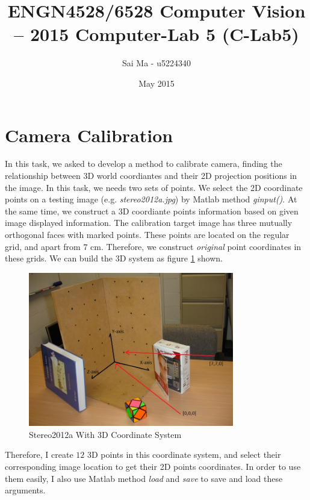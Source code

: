 \documentclass[12pt]{article}
\title{ENGN4528/6528 Computer Vision – 2015 Computer-Lab 5 (C-Lab5)}
\author{Sai Ma - u5224340}
\date{May 2015}
\begin{document}
\maketitle


\section{Camera Calibration}
In this task, we asked to develop a method to calibrate camera, finding the relationship between 3D world coordiantes and their 2D projection positions in the image. In this task, we needs two sets of points. We select the 2D coordinate points on a testing image (e.g. \textit{stereo2012a.jpg}) by Matlab method \textit{ginput()}. At the same time, we construct a 3D coordiante points information based on given image displayed information. The calibration target image has three mutually orthogonal faces with marked points. These points are located on the regular grid, and apart from $7$ cm. Therefore, we construct \textit{original} point coordinates in these grids. We can build the 3D system as figure \ref{fig:stereo2012aWithPoints} shown.

\begin{figure}[h]
    \centering
    \includegraphics[width=0.8\textwidth]{stereo2012aWithPoints.jpg}
    \caption{Stereo2012a With 3D Coordinate System}
    \label{fig:stereo2012aWithPoints}
\end{figure}

Therefore, I create $12$ 3D points in this coordinate system, and select their corresponding image location to get their 2D points coordinates. In order to use them easily, I also use Matlab method \textit{load} and \textit{save} to save and load these arguments.
\end{document}
